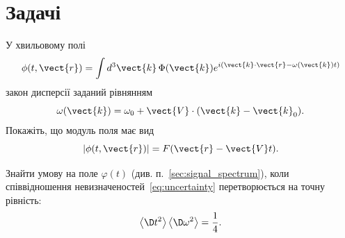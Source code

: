 
\section*{Задачі}

\begin{problem}
	У хвильовому полі
	\[
		\phi(t, \vect{r}) = \int d^3 \vect{k} \, \Phi(\vect{k}) e^{i(\vect{k} \cdot \vect{r} - \omega(\vect{k}) t)}
	\]
	закон дисперсії заданий рівнянням
	\[
		\omega(\vect{k}) = \omega_0 + \vect{V} \cdot (\vect{k} - \vect{k}_0).
	\]
	Покажіть, що модуль поля має вид
	\[
		|\phi(t, \vect{r})| = F(\vect{r} - \vect{V}t).
	\]
\end{problem}

\begin{problem}
	Знайти умову на поле \( \varphi(t) \) (див. п.~\ref{sec:signal_spectrum}), коли співвідношення
	невизначеностей~\eqref{eq:uncertainty} перетворюється на точну рівність:
	\[
		\left\langle \D t^2 \right\rangle \left\langle \D \omega^2 \right\rangle = \frac14.
	\]
\end{problem}
